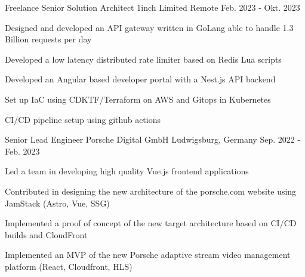 
\begin{cventries}

  \cventry
    {Freelance Senior Solution Architect} %
    {1inch Limited} %
    {Remote} %
    {Feb. 2023 - Okt. 2023} %
    {
      \begin{cvitems} %
        \item {Designed and developed an API gateway written in GoLang able to handle 1.3 Billion requests per day}
        \item {Developed a low latency distributed rate limiter based on Redis Lua scripts}
        \item {Developed an Angular based developer portal with a Nest.js API backend}
        \item {Set up IaC using CDKTF/Terraform on AWS and Gitops in Kubernetes}
        \item {CI/CD pipeline setup using github actions}
      \end{cvitems}
    }

  \cventry
    {Senior Lead Engineer} %
    {Porsche Digital GmbH} %
    {Ludwigsburg, Germany} %
    {Sep. 2022 - Feb. 2023} %
    {
      \begin{cvitems} %
        \item {Led a team in developing high quality Vue.js frontend applications}
        \item {Contributed in designing the new architecture of the porsche.com website using JamStack (Astro, Vue, SSG)}
        \item {Implemented a proof of concept of the new target architecture based on CI/CD builds and CloudFront}
        \item {Implemented an MVP of the new Porsche adaptive stream video management platform (React, Cloudfront, HLS)}
      \end{cvitems}
    }


\end{cventries}
